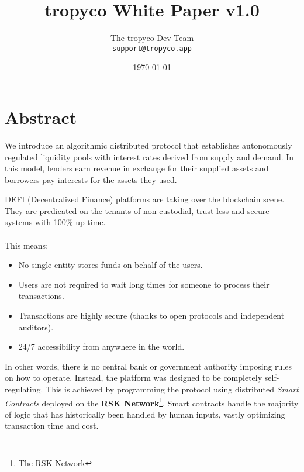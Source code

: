 \documentclass{article}
\title{tropyco White Paper v1.0} %
\author{The tropyco Dev Team\\ \texttt{support@tropyco.app}} %
\date{ \today} %
\begin{document}
\maketitle %


\section*{Abstract}

We introduce an algorithmic distributed protocol that establishes autonomously regulated liquidity pools with interest rates derived from supply and demand. In this model, lenders earn revenue in exchange for their supplied assets and borrowers pay interests for the assets they used.

DEFI (Decentralized Finance) platforms are taking over the blockchain scene. They are predicated on the tenants of non-custodial, trust-less and secure systems with 100\% up-time.
\\ \\
This means:
\begin{itemize}
\item No single entity stores funds on behalf of the users.
\item Users are not required to wait long times for someone to process their transactions.
\item Transactions are highly secure (thanks to open protocols and independent auditors).
\item 24/7 accessibility from anywhere in the world.
\end{itemize}
In other words, there is no central bank or government authority imposing rules on how to operate. Instead, the platform was designed to be completely self-regulating. This is achieved by programming the protocol using distributed \textit{Smart Contracts} deployed on the \textbf{RSK Network}\footnote{\href{https://www.rsk.co/}{The RSK Network}}. Smart contracts handle the majority of logic that has historically been handled by human inputs, vastly optimizing transaction time and cost.
\begin{center}
\noindent\rule{8cm}{0.4pt}
\end{center}

\end{document}
